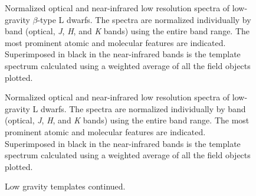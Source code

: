 \documentclass[12pt,preprint]{aastex}
\begin{document}

\begin{figure}
	\caption{Normalized optical and near-infrared low resolution spectra of low-gravity $\beta$-type L
dwarfs. The spectra are normalized individually by band (optical, \emph{J}, \emph{H}, and \emph{K} bands)
using the entire band range. The most prominent atomic and molecular features are indicated. Superimposed in black in the near-infrared
bands is the template spectrum calculated using a weighted average of all the
field objects plotted.}
	\label{fig:beta_templates}
\end{figure}


\begin{figure}
	\caption{Normalized optical and near-infrared low resolution spectra of low-gravity L
dwarfs. The spectra are normalized individually by band (optical, \emph{J}, \emph{H}, and \emph{K} bands)
using the entire band range. The most prominent atomic and molecular features are indicated. Superimposed in black in the near-infrared
bands is the template spectrum calculated using a weighted average of all the
field objects plotted. }
	\label{fig:gamma_templates}
\end{figure}

\begin{figure}
	\caption{Low gravity templates continued.}
\end{figure}
\end{document}
